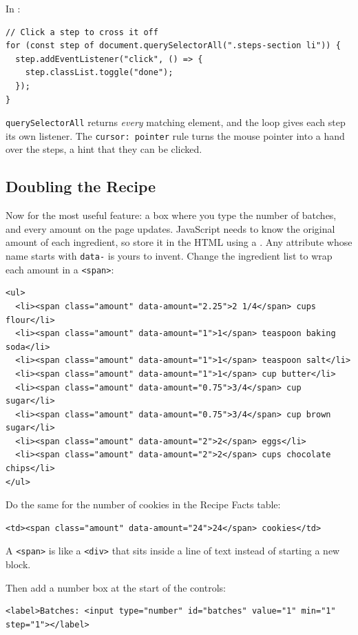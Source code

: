 In :

\begin{verbatim}
// Click a step to cross it off
for (const step of document.querySelectorAll(".steps-section li")) {
  step.addEventListener("click", () => {
    step.classList.toggle("done");
  });
}
\end{verbatim}

\verb|querySelectorAll| returns \emph{every} matching element, and the loop gives each step its own
listener. The \verb|cursor: pointer| rule turns the mouse pointer into a hand over the steps, a hint that
they can be clicked.

\subsection{Doubling the Recipe}
Now for the most useful feature: a box where you type the number of batches, and every amount on the page
updates. JavaScript needs to know the original amount of each ingredient, so store it in the HTML using a
. Any attribute whose name starts with \verb|data-| is yours
to invent. Change the ingredient list to wrap each amount in a \verb|<span>|:

\begin{verbatim}
<ul>
  <li><span class="amount" data-amount="2.25">2 1/4</span> cups flour</li>
  <li><span class="amount" data-amount="1">1</span> teaspoon baking soda</li>
  <li><span class="amount" data-amount="1">1</span> teaspoon salt</li>
  <li><span class="amount" data-amount="1">1</span> cup butter</li>
  <li><span class="amount" data-amount="0.75">3/4</span> cup sugar</li>
  <li><span class="amount" data-amount="0.75">3/4</span> cup brown sugar</li>
  <li><span class="amount" data-amount="2">2</span> eggs</li>
  <li><span class="amount" data-amount="2">2</span> cups chocolate chips</li>
</ul>
\end{verbatim}

Do the same for the number of cookies in the Recipe Facts table:
\begin{verbatim}
<td><span class="amount" data-amount="24">24</span> cookies</td>
\end{verbatim}
A \verb|<span>| is like a \verb|<div>|
that sits inside a line of text instead of starting a new block.

Then add a number box at the start of the controls:

\begin{verbatim}
<label>Batches: <input type="number" id="batches" value="1" min="1" step="1"></label>
\end{verbatim}

